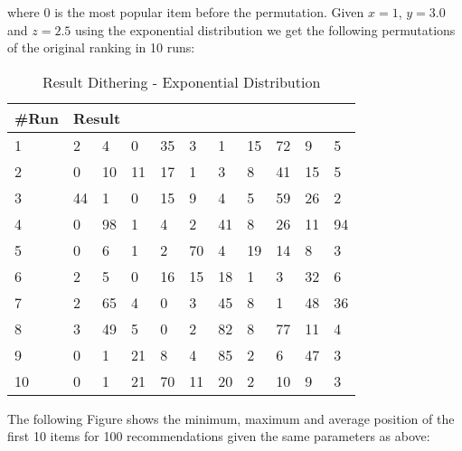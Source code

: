 where 0 is the most popular item before the permutation. Given $x=1$, $y=3.0$ and $z=2.5$ using the exponential distribution we get the following permutations of the original ranking in 10 runs:

\begin{table}[H]
	\centering
	\begin{tabular}{*{11}l}
	\toprule
	\multicolumn{1}{l}{\#Run} & \multicolumn{10}{l}{Result} \\ \midrule
	1	& 2 &  4 &  0 &  35 &  3 &  1 &  15 &  72 &  9 &  5\\
	2	& 0 &  10 &  11 &  17 &  1 &  3 &  8 &  41 &  15 &  5\\
	3	& 44 &  1 &  0 &  15 &  9 &  4 &  5 &  59 &  26 &  2\\
	4	& 0 &  98 &  1 &  4 &  2 &  41 &  8 &  26 &  11 &  94\\
	5	& 0 &  6 &  1 &  2 &  70 &  4 &  19 &  14 &  8 &  3\\
	6	& 2 &  5 &  0 &  16 &  15 &  18 &  1 &  3 &  32 &  6\\
	7	& 2 &  65 &  4 &  0 &  3 &  45 &  8 &  1 &  48 &  36\\
	8	& 3 &  49 &  5 &  0 &  2 &  82 &  8 &  77 &  11 &  4\\
	9	& 0 &  1 &  21 &  8 &  4 &  85 &  2 &  6 &  47 &  3\\
	10	& 0 &  1 &  21 &  70 &  11 &  20 &  2 & 10 & 9& 3 \\
	\bottomrule
\end{tabular}
\caption{Result Dithering - Exponential Distribution}
\end{table}

The following Figure shows the minimum, maximum and average position of the first 10 items for 100 recommendations
given the same parameters as above:



